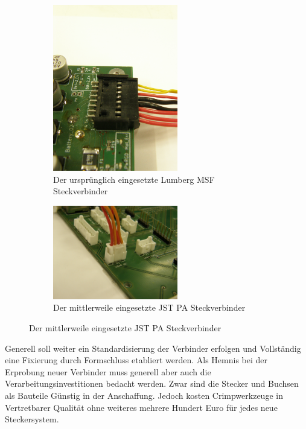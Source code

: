 \begin{figure}[H]

\begin{subfigure}{}
\includegraphics[width=0.6\textwidth, center]{bilder/Stecker/Stecker_Lumberg_MSF.jpg} 
\caption{Der ursprünglich eingesetzte Lumberg MSF Steckverbinder} 
\label{fig:Der ursprünglich eingesetzte Lumberg MSF Steckverbinder}
\end{subfigure}

\begin{subfigure}{}
\includegraphics[width=0.6\textwidth, center]{bilder/Stecker/Stecker_JST_PA.jpg} 
\caption{Der mittlerweile eingesetzte JST PA Steckverbinder} 
\label{fig:Der mittlerweile eingesetzte JST PA Steckverbinder}
\end{subfigure}

\end{figure}

Generell soll weiter ein Standardisierung der Verbinder erfolgen und Vollständig eine Fixierung durch Formschluss etabliert werden.
Als Hemnis bei der Erprobung neuer Verbinder muss generell aber auch die Verarbeitungsinvestitionen bedacht werden. Zwar sind die Stecker und Buchsen als Bauteile Günstig in der Anschaffung. Jedoch kosten Crimpwerkzeuge in Vertretbarer Qualität ohne weiteres mehrere Hundert Euro für jedes neue Steckersystem.





